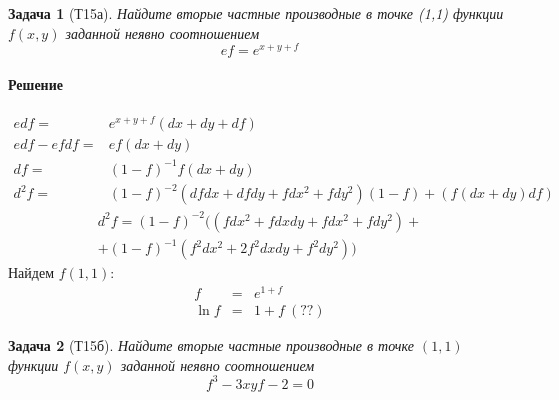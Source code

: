 \documentclass[a4paper,12pt]{report}
\newtheorem{problem}{Задача}[]
\newenvironment{sol}{\paragraph{Решение}}{}
\begin{document}
    \begin{problem}[Т15а]
        Найдите вторые частные производные в точке (1,1) функции $f(x,y)$ заданной неявно соотношением
        $$ ef=e^{x+y+f} $$
    \end{problem}
    \begin{sol}
        \begin{eqnarray*}
            edf=&e^{x+y+f}(dx+dy+df)\\ 
            edf-efdf=&ef(dx+dy)\\ 
            df=&(1-f)^{-1}f(dx+dy)\\ 
            d^2f=&(1-f)^{-2}(dfdx+dfdy+fdx^2+fdy^2)(1-f)+(f(dx+dy)df)
        \end{eqnarray*}
        \begin{eqnarray*}
            d^2f=(1-f)^{-2}((fdx^2+fdxdy+fdx^2+fdy^2)+\\ 
            +(1-f)^{-1}(f^2dx^2+2f^2dxdy+f^2dy^2))
        \end{eqnarray*}
        Найдем $f(1,1)$:
        \begin{eqnarray*}
            f&=&e^{1+f}\\ 
            \ln f&=&1+f\ (??)
        \end{eqnarray*}
    \end{sol}
    \begin{problem}[Т15б]
        Найдите вторые частные производные в точке $(1,1)$ функции $f(x,y)$ заданной неявно соотношением
        \[
          f^3-3xyf-2=0  
        \]
    \end{problem}
\end{document}
